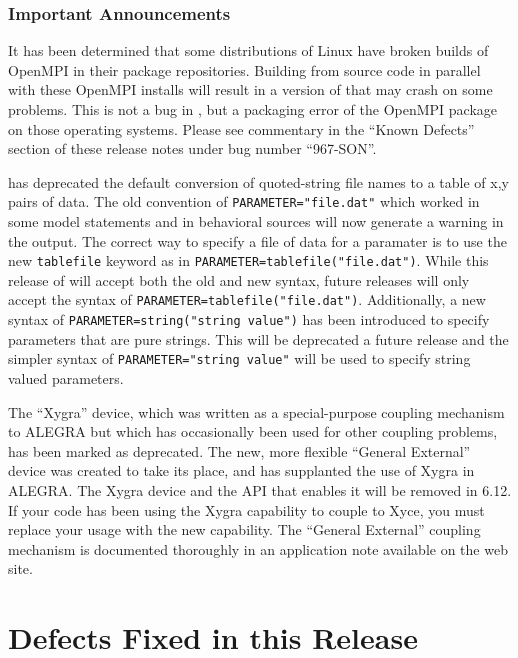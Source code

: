 \documentclass[letterpaper]{scrartcl}
\begin{document}
\subsubsection*{Important Announcements}
\begin{XyceItemize}
\item It has been determined that some distributions of Linux have
  broken builds of OpenMPI in their package repositories.  Building
  \Xyce{} from source code in parallel with these OpenMPI installs
  will result in a version of \Xyce{} that may crash on some problems.
  This is not a bug in \Xyce{}, but a packaging error of the OpenMPI
  package on those operating systems.  Please see commentary in the
  ``Known Defects'' section of these release notes under bug number
  ``967-SON''.
\item \Xyce{} has deprecated the default conversion of quoted-string file
  names to a table of x,y pairs of data.  The old convention of
  \texttt{PARAMETER="file.dat"} which worked in some model statements
  and in behavioral sources will now generate a warning in the \Xyce{}
  output.  The correct way to specify a file of data for a paramater
  is to use the new \texttt{tablefile} keyword as in
  \texttt{PARAMETER=tablefile("file.dat")}.  While this release of
  \Xyce{} will accept both the old and new syntax, future releases
  will only accept the syntax of
  \texttt{PARAMETER=tablefile("file.dat")}.  Additionally, a new
  syntax of \texttt{PARAMETER=string("string value")} has been
  introduced to specify parameters that are pure strings.  This will
  be deprecated a future release and the simpler syntax of
  \texttt{PARAMETER="string value"} will be used to specify string
  valued parameters.
\item The ``Xygra'' device, which was written as a special-purpose
  coupling mechanism to ALEGRA but which has occasionally been used
  for other coupling problems, has been marked as deprecated.  The
  new, more flexible ``General External'' device was created to take
  its place, and has supplanted the use of Xygra in ALEGRA.  The Xygra
  device and the API that enables it will be removed in \Xyce{} 6.12.
  If your code has been using the Xygra capability to couple to Xyce,
  you must replace your usage with the new capability.  The ``General
  External'' coupling mechanism is documented thoroughly in an
  application note available on the \Xyce{} web site.
\end{XyceItemize}

\newpage
\section{Defects Fixed in this Release}

\end{document}
